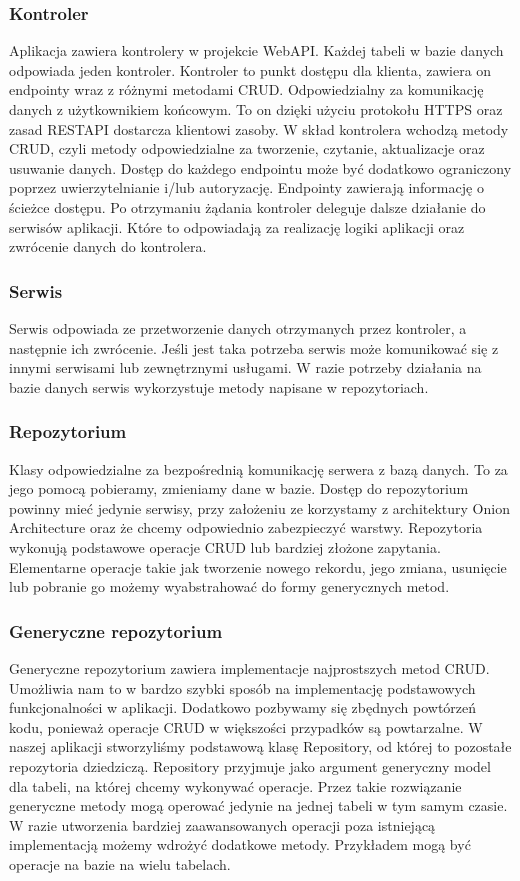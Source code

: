 \documentclass[a4paper,twoside,12pt]{book}
\begin{document}
\subsubsection{Kontroler}
Aplikacja zawiera kontrolery w projekcie WebAPI. Każdej tabeli w bazie danych odpowiada jeden kontroler.  Kontroler to punkt dostępu dla klienta, zawiera on endpointy wraz z różnymi metodami CRUD. Odpowiedzialny za komunikację danych z użytkownikiem końcowym. To on dzięki użyciu protokołu HTTPS oraz zasad RESTAPI dostarcza klientowi zasoby. W skład kontrolera wchodzą metody CRUD, czyli metody odpowiedzialne za tworzenie, czytanie, aktualizacje oraz usuwanie danych. Dostęp do każdego endpointu może być dodatkowo ograniczony poprzez uwierzytelnianie i/lub autoryzację. Endpointy zawierają informację o ścieżce dostępu. Po otrzymaniu żądania kontroler deleguje dalsze działanie do serwisów aplikacji. Które to odpowiadają za realizację logiki aplikacji oraz zwrócenie danych do kontrolera. 

\subsubsection{Serwis}
Serwis odpowiada ze przetworzenie danych otrzymanych przez kontroler, a następnie ich zwrócenie. Jeśli jest taka potrzeba serwis może komunikować się z innymi serwisami lub zewnętrznymi usługami. W razie potrzeby działania na bazie danych serwis wykorzystuje metody napisane w repozytoriach.  

\subsubsection{Repozytorium}
Klasy odpowiedzialne za bezpośrednią komunikację serwera z bazą danych. To za jego pomocą pobieramy, zmieniamy dane w bazie. Dostęp do repozytorium powinny mieć jedynie serwisy, przy założeniu ze korzystamy z architektury Onion Architecture oraz że chcemy odpowiednio zabezpieczyć warstwy. Repozytoria wykonują podstawowe operacje CRUD lub bardziej złożone zapytania. Elementarne operacje takie jak tworzenie nowego rekordu, jego zmiana, usunięcie lub pobranie go możemy wyabstrahować do formy generycznych metod. 

\subsubsection{Generyczne repozytorium}
Generyczne repozytorium zawiera implementacje najprostszych metod CRUD. Umożliwia nam to w bardzo szybki sposób na implementację podstawowych funkcjonalności w aplikacji. Dodatkowo pozbywamy się zbędnych powtórzeń kodu, ponieważ operacje CRUD w większości przypadków są powtarzalne. W naszej aplikacji stworzyliśmy podstawową klasę Repository, od której to pozostałe repozytoria dziedziczą. Repository przyjmuje jako argument generyczny model dla tabeli, na której chcemy wykonywać operacje. Przez takie rozwiązanie generyczne metody mogą operować jedynie na jednej tabeli w tym samym czasie. W razie utworzenia bardziej zaawansowanych operacji poza istniejącą implementacją możemy wdrożyć dodatkowe metody. Przykładem mogą być operacje na bazie na wielu tabelach. 
\end{document}
